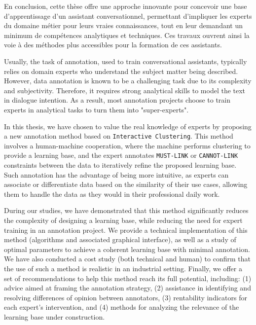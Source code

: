 \begin{ThesisAbstract}
\begin{FrenchAbstract}
		En conclusion, cette thèse offre une approche innovante pour concevoir une base d'apprentissage d'un assistant conversationnel, permettant d'impliquer les experts du domaine métier pour leurs vraies connaissances, tout en leur demandant un minimum de compétences analytiques et techniques.
		Ces travaux ouvrent ainsi la voie à des méthodes plus accessibles pour la formation de ces assistants.
		
	
	\end{FrenchAbstract}
	
	\newpage
	\begin{EnglishAbstract}
		
		Usually, the task of annotation, used to train conversational assistants, typically relies on domain experts who understand the subject matter being described.
		However, data annotation is known to be a challenging task due to its complexity and subjectivity.
		Therefore, it requires strong analytical skills to model the text in dialogue intention.
		As a result, most annotation projects choose to train experts in analytical tasks to turn them into "super-experts".
		
		In this thesis, we have chosen to value the real knowledge of experts by proposing a new annotation method based on \texttt{Interactive Clustering}.
		This method involves a human-machine cooperation, where the machine performs clustering to provide a learning base, and the expert annotates \texttt{MUST-LINK} or \texttt{CANNOT-LINK} constraints between the data to iteratively refine the proposed learning base.
		Such annotation has the advantage of being more intuitive, as experts can associate or differentiate data based on the similarity of their use cases, allowing them to handle the data as they would in their professional daily work.

		During our studies, we have demonstrated that this method significantly reduces the complexity of designing a learning base, while reducing the need for expert training in an annotation project.
		We provide a technical implementation of this method (algorithms and associated graphical interface), as well as a study of optimal parameters to achieve a coherent learning base with minimal annotation.
		We have also conducted a cost study (both technical and human) to confirm that the use of such a method is realistic in an industrial setting.
		Finally, we offer a set of recommendations to help this method reach its full potential, including: (1) advice aimed at framing the annotation strategy, (2) assistance in identifying and resolving differences of opinion between annotators, (3) rentability indicators for each expert's intervention, and (4) methods for analyzing the relevance of the learning base under construction.
		

\end{EnglishAbstract}
\end{ThesisAbstract}
